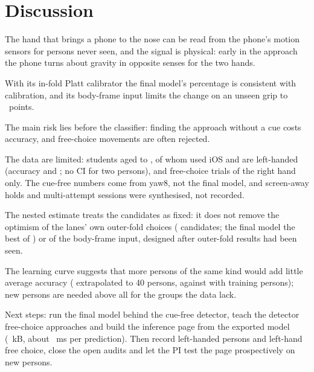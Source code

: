 \section{Discussion}\label{sec:discussion}
The hand that brings a phone to the nose can be read from the phone's motion sensors for persons never seen, and the
signal is physical: early in the approach the phone turns about gravity in opposite senses for the two hands.

With its in-fold Platt calibrator the final model's percentage is consistent with calibration, and its body-frame
input limits the change on an unseen grip to ~points.

The main risk lies before the classifier: finding the approach without a cue costs accuracy, and free-choice
movements are often rejected.

The data are limited:  students aged  to , of whom
 used iOS and  are left-handed (accuracy  and
; no CI for two persons), and free-choice trials of the right hand only. The cue-free numbers
come from yaw8, not the final model, and screen-away holds and multi-attempt sessions were synthesised, not recorded.

The nested estimate treats the  candidates as fixed: it does not remove the optimism of the
lanes' own outer-fold choices ( candidates; the final model the best of
) or of the body-frame input, designed after outer-fold results had been seen.

The learning curve suggests that more persons of the same kind would add little average accuracy
( extrapolated to 40 persons, against  with
 training persons); new persons are needed above all for the groups the data lack.

Next steps: run the final model behind the cue-free detector, teach the detector free-choice approaches and build the
inference page from the exported model (~kB, about ~ms per prediction). Then
record left-handed persons and left-hand free choice, close the open audits and let the PI test the page
prospectively on new persons.
